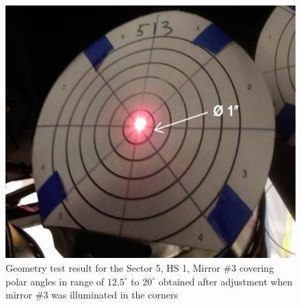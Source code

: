 \begin{figure}[h]
    \centering
    \includegraphics[width=1.0\linewidth,trim={0 0cm 0 0},clip]{images/GEO_TEST_5_1_3_Center.jpg}
    \caption{Geometry test result for the Sector 5, HS 1, Mirror \#3 covering polar angles in range of $12.5^\circ$ to $20^\circ$ obtained after adjustment when mirror \#3 was illuminated in the corners}
    \label{fig:GEO_TEST_5_1_3_Center}
\end{figure}

